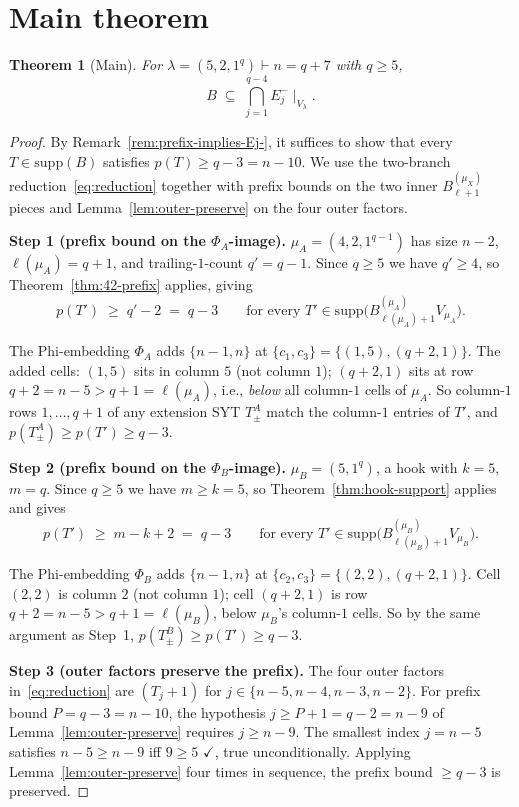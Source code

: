 \documentclass[11pt]{article}
\newtheorem{theorem}{Theorem}
\theoremstyle{definition}
\newcommand{\supp}{\mathrm{supp}}
\begin{document}
\section{Main theorem}\label{sec:main}

\begin{theorem}[Main]\label{thm:main}
For $\lambda = (5, 2, 1^q) \vdash n = q + 7$ with $q \ge 5$,
\[
   B \;\subseteq\; \bigcap_{j=1}^{q-4} E_j^-\!\mid_{V_\lambda}.
\]
\end{theorem}

\begin{proof}
By Remark~\ref{rem:prefix-implies-Ej-}, it suffices to show that every
$T \in \supp(B)$ satisfies $p(T) \ge q - 3 = n - 10$.  We use the
two-branch reduction~\eqref{eq:reduction} together with prefix bounds
on the two inner $B^{(\mu_X)}_{\ell+1}$ pieces and
Lemma~\ref{lem:outer-preserve} on the four outer factors.

\medskip\textbf{Step 1 (prefix bound on the $\Phi_A$-image).}
$\mu_A = (4, 2, 1^{q-1})$ has size $n - 2$, $\ell(\mu_A) = q + 1$, and
trailing-$1$-count $q' = q - 1$.  Since $q \ge 5$ we have $q' \ge 4$,
so Theorem~\ref{thm:42-prefix} applies, giving
\[
   p(T') \;\ge\; q' - 2 \;=\; q - 3
   \qquad \text{for every } T' \in \supp\bigl(B^{(\mu_A)}_{\ell(\mu_A)+1} V_{\mu_A}\bigr).
\]

The Phi-embedding $\Phi_A$ adds $\{n - 1, n\}$ at $\{c_1, c_3\} =
\{(1, 5), (q+2, 1)\}$.  The added cells: $(1, 5)$ sits in column $5$
(not column $1$); $(q+2, 1)$ sits at row $q + 2 = n - 5 > q + 1 =
\ell(\mu_A)$, i.e., \emph{below} all column-$1$ cells of $\mu_A$.  So
column-$1$ rows $1, \ldots, q + 1$ of any extension SYT $T^A_\pm$
match the column-$1$ entries of $T'$, and $p(T^A_\pm) \ge p(T') \ge
q - 3$.

\medskip\textbf{Step 2 (prefix bound on the $\Phi_B$-image).}
$\mu_B = (5, 1^q)$, a hook with $k = 5$, $m = q$.  Since $q \ge 5$ we
have $m \ge k = 5$, so Theorem~\ref{thm:hook-support} applies and
gives
\[
   p(T') \;\ge\; m - k + 2 \;=\; q - 3
   \qquad \text{for every } T' \in \supp\bigl(B^{(\mu_B)}_{\ell(\mu_B)+1} V_{\mu_B}\bigr).
\]

The Phi-embedding $\Phi_B$ adds $\{n - 1, n\}$ at $\{c_2, c_3\} =
\{(2, 2), (q+2, 1)\}$.  Cell $(2, 2)$ is column $2$ (not column $1$);
cell $(q+2, 1)$ is row $q + 2 = n - 5 > q + 1 = \ell(\mu_B)$, below
$\mu_B$'s column-$1$ cells.  So by the same argument as Step~1,
$p(T^B_\pm) \ge p(T') \ge q - 3$.

\medskip\textbf{Step 3 (outer factors preserve the prefix).}
The four outer factors in~\eqref{eq:reduction} are $(T_j{+}1)$ for
$j \in \{n - 5, n - 4, n - 3, n - 2\}$.  For prefix bound $P = q - 3
= n - 10$, the hypothesis $j \ge P + 1 = q - 2 = n - 9$ of
Lemma~\ref{lem:outer-preserve} requires $j \ge n - 9$.  The smallest
index $j = n - 5$ satisfies $n - 5 \ge n - 9$ iff $9 \ge 5$
$\checkmark$, true unconditionally.  Applying
Lemma~\ref{lem:outer-preserve} four times in sequence, the prefix
bound $\ge q - 3$ is preserved.


\end{proof}
\end{document}
